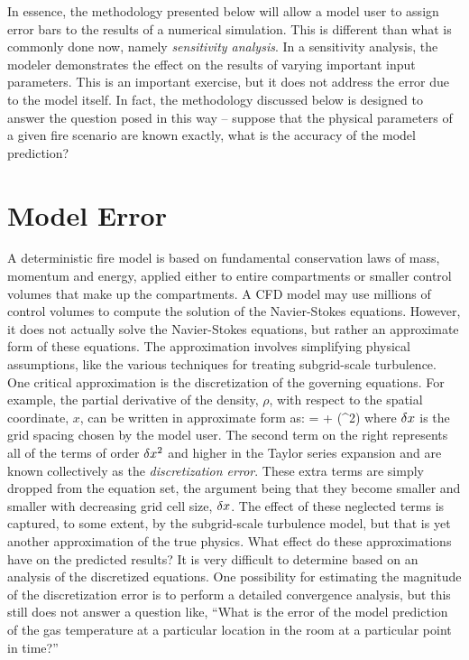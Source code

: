 In essence, the methodology presented below will allow a model user to assign error bars to the results of a numerical simulation. This is different than what is
commonly done now, namely {\em sensitivity analysis}. In a sensitivity analysis, the modeler demonstrates the effect on the results of varying important input parameters.
This is an important exercise, but it does not address the error due to the model itself. In fact, the methodology discussed below is designed to answer the
question posed in this way -- suppose that the physical parameters of a given fire scenario are known exactly, what is the accuracy of the model prediction?


\section{Model Error}

A deterministic fire model is based on fundamental conservation laws of mass, momentum and energy, applied either to entire compartments or smaller control
volumes that make up the compartments. A CFD model may use millions of control volumes to compute the solution of the Navier-Stokes equations.
However, it does not actually solve the Navier-Stokes equations, but rather an approximate form of these equations. The approximation involves simplifying
physical assumptions, like the various techniques for treating subgrid-scale turbulence.
One critical approximation is the discretization of the governing equations. For example, the partial derivative of the density, $\rho$,
with respect to the spatial coordinate, $x$, can be written in approximate form as:
\be {} =  + (\dx^2) \ee
where $\delta x$ is the grid spacing chosen by the model user.
The second term on the right represents all of the terms of order $\delta x^2$ and higher in the Taylor series expansion and are known collectively as the
{\em discretization error}. These extra terms are simply dropped from
the equation set, the argument being that they become smaller and smaller with decreasing grid cell size, $\delta x$. The effect of these neglected terms is captured, to
some extent, by the subgrid-scale turbulence model, but that is yet another approximation of the true physics. What effect do these approximations have on
the predicted results? It is very difficult to determine based on an analysis of the discretized equations. One possibility for estimating
the magnitude of the discretization error is to perform a detailed
convergence analysis, but this still does not answer a
question like, ``What is the error of the model prediction of the gas
temperature at a particular location in the room at a particular point in time?''

